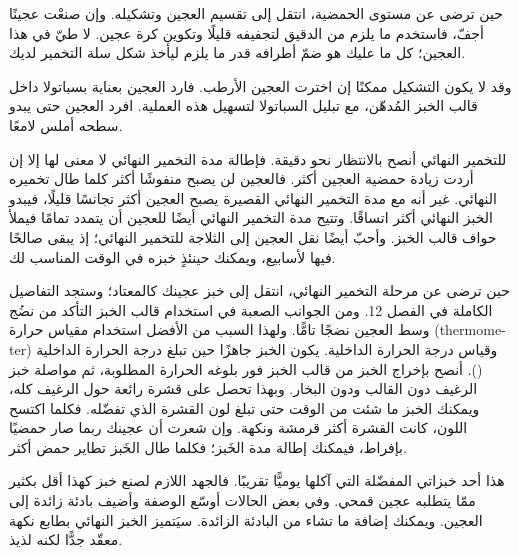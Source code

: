 حين ترضى عن مستوى الحمضية، انتقل إلى تقسيم العجين وتشكيله. وإن صنعْت عجينًا أجفّ، فاستخدم ما يلزم من الدقيق لتجفيفه قليلًا وتكوين كرة عجين. لا طيّ في هذا العجين؛ كل ما عليك هو ضمّ أطرافه قدر ما يلزم ليأخذ شكل سلة التخمير لديك.

وقد لا يكون التشكيل ممكنًا إن اخترت العجين الأرطب. فارد العجين بعناية بسباتولا داخل قالب الخبز المُدهّن، مع تبليل السباتولا لتسهيل هذه العملية. افرد العجين حتى يبدو سطحه أملس لامعًا.

للتخمير النهائي أنصح بالانتظار نحو  دقيقة. فإطالة مدة التخمير النهائي لا معنى لها إلا إن أردت زيادة حمضية العجين أكثر. فالعجين لن يصبح منفوشًا أكثر كلما طال تخميره النهائي. غير أنه مع مدة التخمير النهائي القصيرة يصبح العجين أكثر تجانسًا قليلًا، فيبدو الخبز النهائي أكثر اتساقًا. وتتيح مدة التخمير النهائي أيضًا للعجين أن يتمدد تمامًا فيملأ حواف قالب الخبز. وأحبّ أيضًا نقل العجين إلى الثلاجة للتخمير النهائي؛ إذ يبقى صالحًا فيها لأسابيع، ويمكنك حينئذٍ خبزه في الوقت المناسب لك.

حين ترضى عن مرحلة التخمير النهائي، انتقل إلى خبز عجينك كالمعتاد؛ وستجد التفاصيل الكاملة في الفصل 12. ومن الجوانب الصعبة في استخدام قالب الخبز التأكد من نضُج وسط العجين نضجًا تامًّا. ولهذا السبب من الأفضل استخدام مقياس حرارة \textenglish{(thermometer)} وقياس درجة الحرارة الداخلية. يكون الخبز جاهزًا حين تبلغ درجة الحرارة الداخلية  (). أنصح بإخراج الخبز من قالب الخبز فور بلوغه الحرارة المطلوبة، ثم مواصلة خبز الرغيف دون القالب ودون البخار. وبهذا تحصل على قشرة رائعة حول الرغيف كله، ويمكنك الخبز ما شئت من الوقت حتى تبلغ لون القشرة الذي تفضّله. فكلما اكتسح اللون، كانت القشرة أكثر قرمشة ونكهة. وإن شعرت أن عجينك ربما صار حمضيًا بإفراط، فيمكنك إطالة مدة الخَبز؛ فكلما طال الخَبز تطاير حمض أكثر.

هذا أحد خبزاتي المفضّلة التي آكلها يوميًّا تقريبًا. فالجهد اللازم لصنع خبز كهذا أقل بكثير ممّا يتطلبه عجين قمحي. وفي بعض الحالات أوسّع الوصفة وأضيف بادئة زائدة إلى العجين. ويمكنك إضافة ما تشاء من البادئة الزائدة. سيَتميز الخبز النهائي بطابع نكهة معقّد جدًّا لكنه لذيذ.
